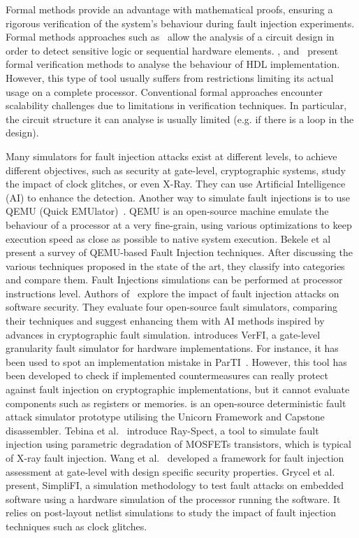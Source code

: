 Formal methods provide an advantage with mathematical proofs, ensuring a rigorous verification of the system's behaviour during fault injection experiments. Formal methods approaches such as~\cite{BSSMG-21-tches} allow the analysis of a circuit design in order to detect sensitive logic or sequential hardware elements. \cite{ANR-18-ices}, \cite{BBCFGS-19-esorics} and~\cite{SVPMRDKMS-24-eprint} present formal verification methods to analyse the behaviour of HDL implementation. However, this type of tool usually suffers from restrictions limiting its actual usage on a complete processor. Conventional formal approaches encounter scalability challenges due to limitations in verification techniques. In particular, the circuit structure it can analyse is usually limited (e.g. if there is a loop in the design).

Many simulators for fault injection attacks exist at different levels, to achieve different objectives, such as security at gate-level, cryptographic systems, study the impact of clock glitches, or even X-Ray. They can use Artificial Intelligence (AI) to enhance the detection. Another way to simulate fault injections is to use QEMU (Quick EMUlator)~\cite{BLK-23-access,HGASO-21-fdtc,KMD-24-ashes}.
QEMU is an open-source machine emulate the behaviour of a processor at a very fine-grain, using various optimizations to keep execution speed as close as possible to native system execution.
Bekele et al~\cite{BLK-23-access} present a survey of QEMU-based Fault Injection techniques. After discussing the various techniques proposed in the state of the art, they classify into categories and compare them.
Fault Injections simulations can be performed at processor instructions level. Authors of~\cite{AB-23-acns} explore the impact of fault injection attacks on software security. They evaluate four open-source fault simulators, comparing their techniques and suggest enhancing them with AI methods inspired by advances in cryptographic fault simulation. 
\cite{AWMN-20-host} introduces VerFI, a gate-level granularity fault simulator for hardware implementations. For instance, it has been used to spot an implementation mistake in ParTI~\cite{SMG-16-crypto}. However, this tool has been developed to check if implemented countermeasures can really protect against fault injection on cryptographic implementations, but it cannot evaluate components such as registers or memories.
\cite{fisim} is an open-source deterministic fault attack simulator prototype utilising the Unicorn Framework and Capstone disassembler.
Tebina et al.~\cite{TMZHM-23-iolts} introduce Ray-Spect, a tool to simulate fault injection using parametric degradation of MOSFETs transistors, which is typical of X-ray fault injection.
Wang et al.~\cite{WLRTF-22-tcad} developed a framework for fault injection assessment at gate-level with design specific security properties.
Grycel et al.~\cite{GS-21-jcrypto} present, SimpliFI, a simulation methodology to test fault attacks on embedded software using a hardware simulation of the processor running the software. It relies on post-layout netlist simulations to study the impact of fault injection techniques such as clock glitches.

